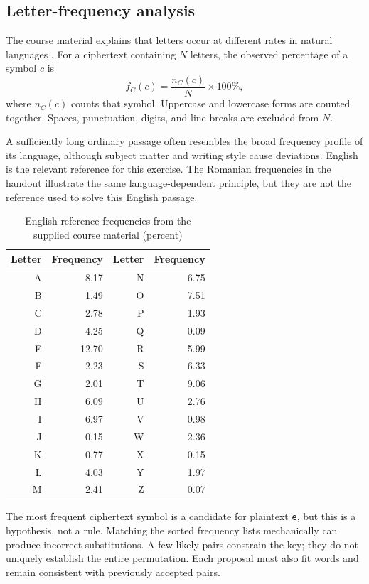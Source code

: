 \subsection{Letter-frequency analysis}
The course material explains that letters occur at different rates in natural languages \cite{handout}. For a ciphertext containing $N$ letters, the observed percentage of a symbol $c$ is
\begin{equation}
  f_C(c)=\frac{n_C(c)}{N}\times100\%,
\end{equation}
where $n_C(c)$ counts that symbol. Uppercase and lowercase forms are counted together. Spaces, punctuation, digits, and line breaks are excluded from $N$.

A sufficiently long ordinary passage often resembles the broad frequency profile of its language, although subject matter and writing style cause deviations. English is the relevant reference for this exercise. The Romanian frequencies in the handout illustrate the same language-dependent principle, but they are not the reference used to solve this English passage.

\begin{table}[htbp]
\centering
\caption{English reference frequencies from the supplied course material (percent)}
\label{tab:english}
\small
\begin{tabular}{rr@{\hspace{1.3cm}}rr}
\hline
Letter & Frequency & Letter & Frequency\\
\hline
A & 8.17 & N & 6.75\\
B & 1.49 & O & 7.51\\
C & 2.78 & P & 1.93\\
D & 4.25 & Q & 0.09\\
E & 12.70 & R & 5.99\\
F & 2.23 & S & 6.33\\
G & 2.01 & T & 9.06\\
H & 6.09 & U & 2.76\\
I & 6.97 & V & 0.98\\
J & 0.15 & W & 2.36\\
K & 0.77 & X & 0.15\\
L & 4.03 & Y & 1.97\\
M & 2.41 & Z & 0.07\\
\hline
\end{tabular}
\end{table}

The most frequent ciphertext symbol is a candidate for plaintext \texttt{e}, but this is a hypothesis, not a rule. Matching the sorted frequency lists mechanically can produce incorrect substitutions. A few likely pairs constrain the key; they do not uniquely establish the entire permutation. Each proposal must also fit words and remain consistent with previously accepted pairs.

